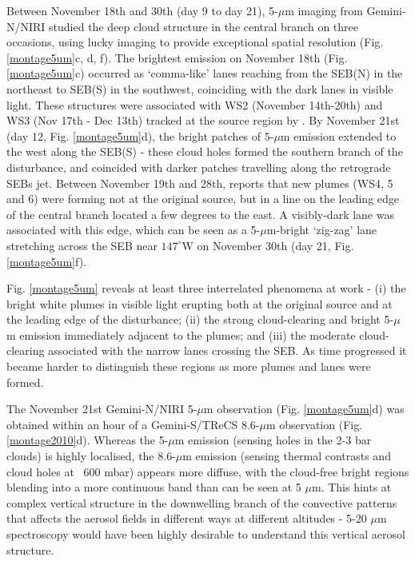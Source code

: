 \documentclass[final,authoryear,5p,times,twocolumn]{elsarticle}
\begin{document}
Between November 18th and 30th (day 9 to day 21), 5-$\mu$m imaging from Gemini-N/NIRI studied the deep cloud structure in the central branch on three occasions, using lucky imaging to provide exceptional spatial resolution (Fig. \ref{montage5um}c, d, f).  The brightest emission on November 18th (Fig. \ref{montage5um}c) occurred as `comma-like' lanes reaching from the SEB(N) in the northeast to SEB(S) in the southwest, coinciding with the dark lanes in visible light.  These structures were associated with WS2 (November 14th-20th) and WS3 (Nov 17th - Dec 13th) tracked at the source region by \citet{11rogers_21}.  By November 21st (day 12, Fig. \ref{montage5um}d), the bright patches of 5-$\mu$m emission extended to the west along the SEB(S) - these cloud holes formed the southern branch of the disturbance, and coincided with darker patches travelling along the retrograde SEBs jet.   Between November 19th and 28th, \citet{11rogers_21} reports that new plumes (WS4, 5 and 6) were forming not at the original source, but in a line on the leading edge of the central branch located a few degrees to the east.  A visibly-dark lane was associated with this edge, which can be seen as a 5-$\mu$m-bright `zig-zag' lane stretching across the SEB near $147^\circ$W on November 30th (day 21, Fig. \ref{montage5um}f). 

Fig. \ref{montage5um} reveals at least three interrelated phenomena at work - (i) the bright white plumes in visible light erupting both at the original source and at the leading edge of the disturbance; (ii) the strong cloud-clearing and bright 5-$\mu$m emission immediately adjacent to the plumes; and (iii) the moderate cloud-clearing associated with the narrow lanes crossing the SEB.  As time progressed it became harder to distinguish these regions as more plumes and lanes were formed.  

The November 21st Gemini-N/NIRI 5-$\mu$m observation (Fig. \ref{montage5um}d) was obtained within an hour of a Gemini-S/TReCS 8.6-$\mu$m observation (Fig. \ref{montage2010}d).  Whereas the 5-$\mu$m emission (sensing holes in the 2-3 bar clouds) is highly localised, the 8.6-$\mu$m emission (sensing thermal contrasts and cloud holes at ~600 mbar) appears more diffuse, with the cloud-free bright regions blending into a more continuous band than can be seen at 5 $\mu$m.  This hints at complex vertical structure in the downwelling branch of the convective patterns that affects the aerosol fields in different ways at different altitudes - 5-20 $\mu$m spectroscopy would have been highly desirable to understand this vertical aerosol structure.
\end{document}
